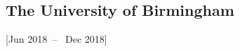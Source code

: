 \documentclass{mycv}
\begin{document}










\subsection{The University of Birmingham}[Jun 2018~--~ Dec 2018]

\end{document}
